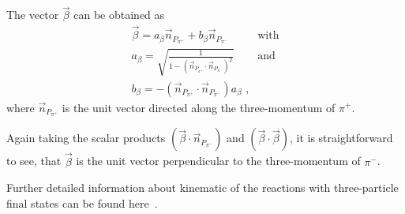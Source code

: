 \documentclass[prc,twocolumn,superscriptaddress,showpacs,amssymb,amsmath,amsfonts,linenumbers,aps]{revtex4-1}
\begin{document}
The vector $\vec \beta$ can be obtained as
\begin{eqnarray}
\vec \beta = a_{\beta}\vec n_{P_{\pi^{+}}} + b_{\beta}\vec n_{P_{\pi^{-}}} & \text{with} \nonumber \\
a_{\beta} = \sqrt{\frac{1}{1 - (\vec n_{P_{\pi^{+}}} \cdot \vec n_{P_{\pi^{-}}})^{2}}} & \text{and} \label{betavec}\\
b_{\beta} = - (\vec n_{P_{\pi^{+}}} \cdot \vec n_{P_{\pi^{-}}}) a_{\beta} \textrm{ ,} \nonumber
\end{eqnarray} 
where $\vec n_{P_{\pi^{+}}}$ is the unit vector directed along the three-momentum of $\pi^{+}$.

Again taking the scalar products $(\vec \beta \cdot \vec
n_{P_{\pi^{-}}})$ and $(\vec \beta \cdot \vec  \beta)$,
it is straightforward to see, that $\vec \beta$ is
the unit vector perpendicular to the 
three-momentum of $\pi^{-}$. 






Further detailed information about kinematic of the reactions with three-particle final states can be found here~\cite{Byckling:1971vca}.



{}

%
\end{document}

